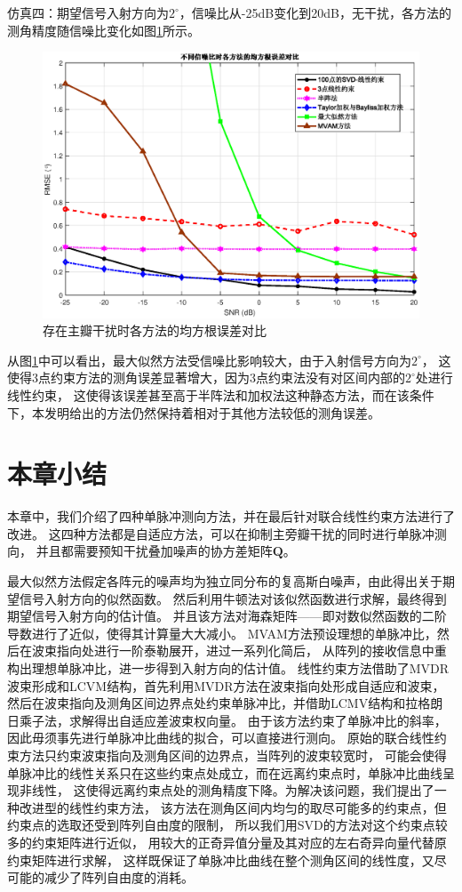 \documentclass[master]{thesis-uestc}
\begin{document}
仿真四：期望信号入射方向为$2^\circ$，信噪比从-25dB变化到20dB，无干扰，各方法的测角精度随信噪比变化如图\ref{SVD-JLC_RMSE_SNR}所示。
\begin{figure}[H]
    \includegraphics[scale=0.5]{pic/SVD-JLC_RMSE_SNR.eps}
    \caption{存在主瓣干扰时各方法的均方根误差对比}
    \label{SVD-JLC_RMSE_SNR}
\end{figure}
从图\ref{SVD-JLC_RMSE_SNR}中可以看出，最大似然方法受信噪比影响较大，由于入射信号方向为$2^\circ$，
这使得3点约束方法的测角误差显著增大，因为3点约束法没有对区间内部的$2^\circ$处进行线性约束，
这使得该误差甚至高于半阵法和加权法这种静态方法，而在该条件下，本发明给出的方法仍然保持着相对于其他方法较低的测角误差。

\section{本章小结}
本章中，我们介绍了四种单脉冲测向方法，并在最后针对联合线性约束方法进行了改进。
这四种方法都是自适应方法，可以在抑制主旁瓣干扰的同时进行单脉冲测向，
并且都需要预知干扰叠加噪声的协方差矩阵$\bm{Q}$。

最大似然方法假定各阵元的噪声均为独立同分布的复高斯白噪声，由此得出关于期望信号入射方向的似然函数。
然后利用牛顿法对该似然函数进行求解，最终得到期望信号入射方向的估计值。
并且该方法对海森矩阵——即对数似然函数的二阶导数进行了近似，使得其计算量大大减小。
MVAM方法预设理想的单脉冲比，然后在波束指向处进行一阶泰勒展开，进过一系列化简后，
从阵列的接收信息中重构出理想单脉冲比，进一步得到入射方向的估计值。
线性约束方法借助了MVDR波束形成和LCVM结构，首先利用MVDR方法在波束指向处形成自适应和波束，
然后在波束指向及测角区间边界点处约束单脉冲比，并借助LCMV结构和拉格朗日乘子法，求解得出自适应差波束权向量。
由于该方法约束了单脉冲比的斜率，因此毋须事先进行单脉冲比曲线的拟合，可以直接进行测向。
原始的联合线性约束方法只约束波束指向及测角区间的边界点，当阵列的波束较宽时，
可能会使得单脉冲比的线性关系只在这些约束点处成立，而在远离约束点时，单脉冲比曲线呈现非线性，
这使得远离约束点处的测角精度下降。为解决该问题，我们提出了一种改进型的线性约束方法，
该方法在测角区间内均匀的取尽可能多的约束点，但约束点的选取还受到阵列自由度的限制，
所以我们用SVD的方法对这个约束点较多的约束矩阵进行近似，
用较大的正奇异值分量及其对应的左右奇异向量代替原约束矩阵进行求解，
这样既保证了单脉冲比曲线在整个测角区间的线性度，又尽可能的减少了阵列自由度的消耗。
\end{document}
